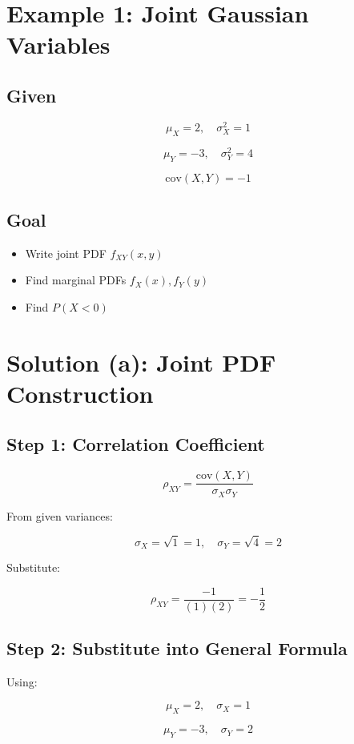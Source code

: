 \documentclass[11pt]{article}
\begin{document}
\section{Example 1: Joint Gaussian Variables}

\subsection{Given}

\[
\mu_X = 2, \quad \sigma_X^2 = 1
\]

\[
\mu_Y = -3, \quad \sigma_Y^2 = 4
\]

\[
\text{cov}(X,Y) = -1
\]

\subsection{Goal}

\begin{itemize}
\item Write joint PDF $f_{XY}(x,y)$
\item Find marginal PDFs $f_X(x), f_Y(y)$
\item Find $P(X < 0)$
\end{itemize}

\section{Solution (a): Joint PDF Construction}

\subsection{Step 1: Correlation Coefficient}

\[
\rho_{XY}
=
\frac{\text{cov}(X,Y)}{\sigma_X \sigma_Y}
\]

From given variances:

\[
\sigma_X = \sqrt{1} = 1, \quad \sigma_Y = \sqrt{4} = 2
\]

Substitute:

\[
\rho_{XY}
=
\frac{-1}{(1)(2)}
=
-\frac{1}{2}
\]

\subsection{Step 2: Substitute into General Formula}

Using:

\[
\mu_X = 2, \quad \sigma_X = 1
\]

\[
\mu_Y = -3, \quad \sigma_Y = 2
\]
\end{document}
